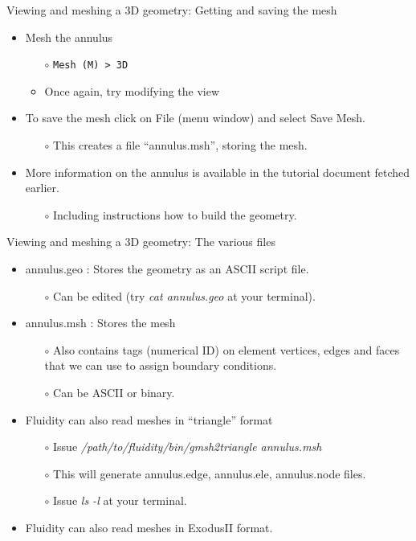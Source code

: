 \documentclass[t]{beamer}
\begin{document}
\begin{frame}{Viewing and meshing a 3D geometry: Getting and saving the mesh}
\begin{itemize}
\item Mesh the annulus
\begin{itemize}
  \item[$\circ$] \lstinline{Mesh (M) > 3D}
  \item[$\circ$] Once again, try modifying the view
\end{itemize}
\vspace{5pt}
\item To save the mesh click on File (menu window) and select Save Mesh.
\begin{itemize}
  \item[$\circ$] This creates a file ``annulus.msh'', storing the mesh.
\end{itemize}
\vspace{5pt}
\item More information on the annulus is available in the tutorial document fetched earlier.
\begin{itemize}
  \item[$\circ$] Including instructions how to build the geometry.
\end{itemize}
\end{itemize}
\end{frame}

\begin{frame}{Viewing and meshing a 3D geometry: The various files}
   \begin{itemize}
      \item annulus.geo : Stores the geometry as an ASCII script file.
      \begin{itemize}
         \item[$\circ$] Can be edited (try \emph{cat annulus.geo} at your terminal).
      \end{itemize}
      \item annulus.msh : Stores the mesh
      \begin{itemize}
         \item[$\circ$] Also contains tags (numerical ID) on element vertices, edges and faces that we can use to assign boundary conditions.
         \item[$\circ$] Can be ASCII or binary.
      \end{itemize}\vspace{20pt}
      \item Fluidity can also read meshes in ``triangle'' format
      \begin{itemize}
         \item[$\circ$] Issue \emph{/path/to/fluidity/bin/gmsh2triangle annulus.msh}
         \item[$\circ$] This will generate annulus.edge, annulus.ele, annulus.node files.
         \item[$\circ$] Issue \emph{ls -l} at your terminal.
      \end{itemize}
      \item Fluidity can also read meshes in ExodusII format.
   \end{itemize}
\end{frame}
\end{document}
